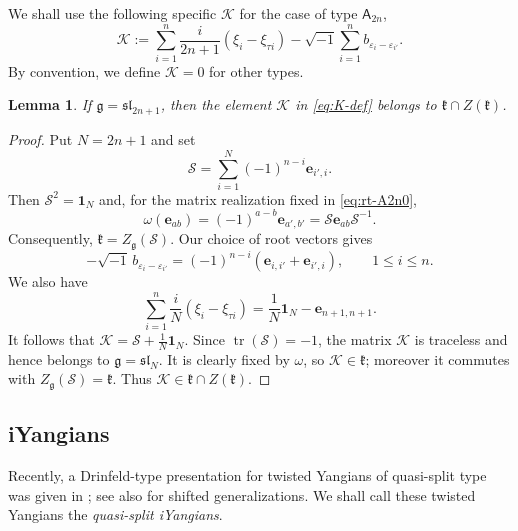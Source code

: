 \documentclass[11pt,reqno]{amsart}
\numberwithin{equation}{section}
\newtheorem{lem}[thm]{Lemma}
\theoremstyle{definition}
\theoremstyle{remark}
\newcommand{\beq}{\begin{equation}}
\newcommand{\eeq}{\end{equation}}
\newcommand{\g}{\mathfrak{g}}
\newcommand{\lle}{\leqslant}
\newcommand{\ve}{\varepsilon}
\begin{document}
We shall use the following specific $\mathscr K$ for the case of type $\mathsf A_{2n}$,
\beq\label{eq:K-def}
\mathscr K:=\sum_{i=1}^n \frac{i}{2n+1}(\xi_i-\xi_{\tau i})-\sqrt{-1}\sum_{i=1}^n b_{\ve_i-\ve_{i'}}.
\eeq
By convention, we define $\mathscr K=0$ for other types.

\begin{lem}\label{lem:K-central}
If $\g=\mathfrak{sl}_{2n+1}$, then the element $\mathscr K$ in \eqref{eq:K-def} belongs to $\mathfrak k\cap Z(\mathfrak k)$.
\end{lem}
\begin{proof}
Put $N=2n+1$ and set
\[
 \mathscr S=\sum_{i=1}^{N}(-1)^{n-i}\mathbf e_{i',i}.
\]
Then $\mathscr S^2=\mathbf 1_N$ and, for the matrix realization fixed in
\eqref{eq:rt-A2n0},
\[
 \omega(\mathbf e_{ab})=(-1)^{a-b}\mathbf e_{a',b'}
 =\mathscr S\mathbf e_{ab}\mathscr S^{-1}.
\]
Consequently, $\mathfrak k=Z_{\mathfrak g}(\mathscr S)$.  Our choice of root
vectors gives
\[
 -\sqrt{-1}\,b_{\ve_i-\ve_{i'}}
 =(-1)^{n-i}(\mathbf e_{i,i'}+\mathbf e_{i',i}),
 \qquad 1\lle i\lle n.
\]
We also have
\[
 \sum_{i=1}^n\frac{i}{N}(\xi_i-\xi_{\tau i})
 =\frac1N\mathbf 1_N-\mathbf e_{n+1,n+1}.
\]
It follows that $\mathscr K=\mathscr S+\frac1N\mathbf 1_N$. Since $\operatorname{tr}(\mathscr S)=-1$, the matrix $\mathscr K$ is traceless and
hence belongs to $\mathfrak g=\mathfrak{sl}_N$.  It is clearly fixed by $\omega$, so
$\mathscr K\in\mathfrak k$; moreover it commutes with
$Z_{\mathfrak g}(\mathscr S)=\mathfrak k$.  Thus
$\mathscr K\in\mathfrak k\cap Z(\mathfrak k)$.
\end{proof}

\subsection{iYangians}\label{sec:iy}
Recently, a Drinfeld-type presentation for twisted Yangians of quasi-split type was given in \cite{LZ24}; see also \cite{LWW25SiY} for shifted generalizations. We shall call these twisted Yangians the \emph{quasi-split iYangians}.
\end{document}

